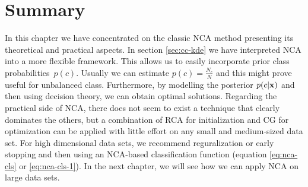 	
\section*{Summary}

In this chapter we have concentrated on the classic NCA method presenting its theoretical and practical aspects. In section \ref{sec:cc-kde} we have interpreted NCA into a more flexible framework. This allows us to easily incorporate prior class probabilities~$p(c)$. Usually we can estimate $p(c)=\frac{N_c}{N}$ and this might prove useful for unbalanced class. Furthermore, by modelling the posterior $p(c|\mathbf{x})$  and then using decision theory, we can obtain optimal solutions. Regarding the practical side of NCA, there does not seem to exist a technique that clearly dominates the others, but a combination of RCA for initialization and CG for optimization can be applied with little effort on any small and medium-sized data set. For high dimensional data sets, we recommend reguralization or early stopping and then using an NCA-based classification function (equation \ref{eq:nca-cls} or \ref{eq:nca-cls-1}). In the next chapter, we will see how we can apply NCA on large data sets.

